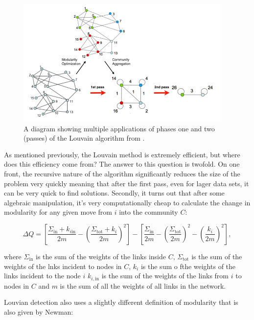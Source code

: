 \begin{figure}
    \begin{center}
        \includegraphics[width=0.95\textwidth]{img/3/louvain}
    \end{center}
    \caption{A diagram showing multiple applications of phases one and two (passes) of the Louvain algorithm from \cite{Blondel_2008}.}
    \label{fig:louvain_aggregation_diagram}
\end{figure}

As mentioned previously, the Louvain method is extremely efficient, but where does this efficiency come from? The answer to this question is twofold. On one front, the recursive nature of the algorithm significantly reduces the size of the problem very quickly meaning that after the first pass, even for lager data sets, it can be very quick to find solutions. Secondly, it turns out that after some algebraic manipulation, it's very computationally cheap to calculate the change in modularity for any given move from $i$ into the community $C$:

$$ \Delta Q = \left [\frac{\Sigma_{\text{in}} + k_{i \text{in}}}{2m} - \left (\frac{\Sigma_{\text{tot}} + k_i}{2m} \right )^2 \right ] - \left [ \frac{\Sigma_{\text{in}}}{2m} - \left ( \frac{\Sigma_{\text{tot}}}{2m} \right )^2 - \left ( \frac{k_i}{2m} \right )^2\right ], $$

\noindent
where $\Sigma_{\text{in}}$ is the sum of the weights of the links inside $C$, $\Sigma_{\text{tot}}$ is the sum of the weights of the lnks incident to nodes in $C$, $k_i$ is the sum o fthe weights of the links incident to the node $i$ $k_{i, \text{in}}$ is the sum of the weights of the links from $i$ to nodes in $C$ and $m$ is the sum of all the weights of all links in the network.

Louvian detection also uses a slightly different definition of modularity that is also given by Newman\cite{PhysRevE.70.056131}:

